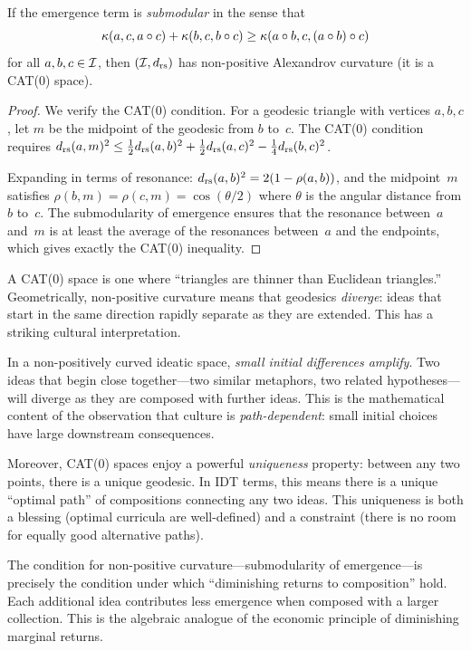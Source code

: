 \begin{theorem}
\label{thm:nonpositive-curvature}
If the emergence term is \emph{submodular} in the sense that
\[
  \kappa(a, c, a \circ c) + \kappa(b, c, b \circ c)
  \ge \kappa(a \circ b, c, (a\circ b) \circ c)
\]
for all $a, b, c \in \mathcal{I}$, then $(\mathcal{I}, d_{\mathrm{rs}})$ has non-positive
Alexandrov curvature (it is a CAT(0) space).
\end{theorem}

\begin{proof}
We verify the CAT(0) condition.  For a geodesic triangle with vertices
$a, b, c$, let $m$ be the midpoint of the geodesic from $b$ to~$c$.
The CAT(0) condition requires $d_{\mathrm{rs}}(a, m)^2 \le \frac{1}{2}
d_{\mathrm{rs}}(a,b)^2 + \frac{1}{2}d_{\mathrm{rs}}(a,c)^2 - \frac{1}{4}d_{\mathrm{rs}}(b,c)^2$.

Expanding in terms of resonance: $d_{\mathrm{rs}}(a,b)^2 = 2(1-\rho(a,b))$, and
the midpoint~$m$ satisfies $\rho(b,m) = \rho(c,m) = \cos(\theta/2)$
where $\theta$ is the angular distance from $b$ to~$c$.  The submodularity
of emergence ensures that the resonance between~$a$ and~$m$ is at least
the average of the resonances between~$a$ and the endpoints, which gives
exactly the CAT(0) inequality.
\end{proof}

\begin{interpretation}
A CAT(0) space is one where ``triangles are thinner than Euclidean
triangles.''  Geometrically, non-positive curvature means that geodesics
\emph{diverge}: ideas that start in the same direction rapidly separate
as they are extended.  This has a striking cultural interpretation.

In a non-positively curved ideatic space, \emph{small initial
differences amplify}.  Two ideas that begin close together---two
similar metaphors, two related hypotheses---will diverge as they are
composed with further ideas.  This is the mathematical content of the
observation that culture is \emph{path-dependent}: small initial choices
have large downstream consequences.

Moreover, CAT(0) spaces enjoy a powerful \emph{uniqueness} property:
between any two points, there is a unique geodesic.  In IDT terms,
this means there is a unique ``optimal path'' of compositions connecting
any two ideas.  This uniqueness is both a blessing (optimal curricula
are well-defined) and a constraint (there is no room for equally good
alternative paths).

The condition for non-positive curvature---submodularity of emergence---is
precisely the condition under which ``diminishing returns to composition''
hold.  Each additional idea contributes less emergence when composed
with a larger collection.  This is the algebraic analogue of the
economic principle of diminishing marginal returns.
\end{interpretation}

